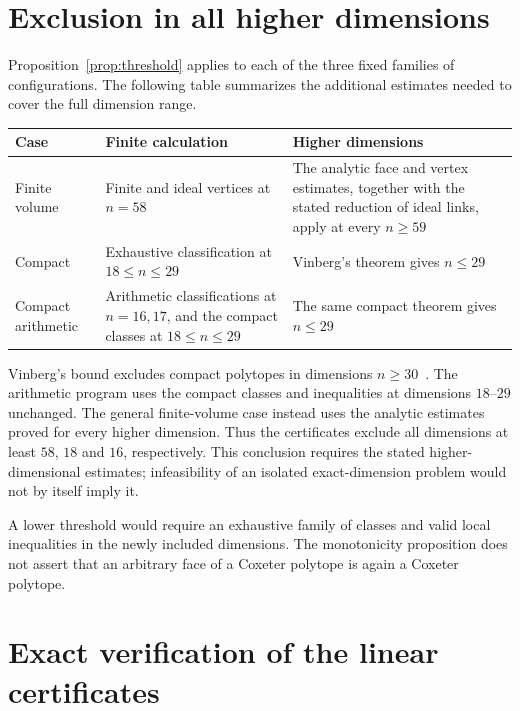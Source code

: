 \documentclass[11pt]{article}
\theoremstyle{definition}
\theoremstyle{remark}
\numberwithin{equation}{section}
\begin{document}
\section{Exclusion in all higher dimensions}
\label{sec:thresholds}

Proposition~\ref{prop:threshold} applies to each of the three fixed
families of configurations. The following table summarizes the
additional estimates needed to cover the full dimension range.

\begin{center}\small
\begin{tabular}{>{\raggedright\arraybackslash}p{.17\linewidth}
 >{\raggedright\arraybackslash}p{.35\linewidth}
 >{\raggedright\arraybackslash}p{.38\linewidth}}
\toprule
Case&Finite calculation&Higher dimensions\\\midrule
Finite volume&Finite and ideal vertices at $n=58$&The analytic face
 and vertex estimates, together with the stated reduction of ideal
 links, apply at every $n\ge59$\\
Compact&Exhaustive classification at $18\le n\le29$&Vinberg's
 theorem gives $n\le29$\\
Compact arithmetic&Arithmetic classifications at $n=16,17$, and
 the compact classes at $18\le n\le29$&The same compact theorem
 gives $n\le29$\\\bottomrule
\end{tabular}
\end{center}

Vinberg's bound excludes compact polytopes in dimensions
$n\ge30$~\cite{Vinberg1984,Vinberg1985}. The arithmetic program
uses the compact classes and inequalities at dimensions $18$--$29$
unchanged. The general finite-volume case instead uses the analytic
estimates proved for every higher dimension. Thus the certificates
exclude all dimensions at least $58$, $18$ and $16$, respectively.
This conclusion requires the stated higher-dimensional estimates;
infeasibility of an isolated exact-dimension problem would not by
itself imply it.

A lower threshold would require an exhaustive family of classes
and valid local inequalities in the newly included dimensions.
The monotonicity proposition does not assert that an arbitrary
face of a Coxeter polytope is again a Coxeter polytope.

\section{Exact verification of the linear certificates}
\label{sec:certificates}
\end{document}
